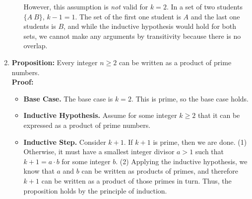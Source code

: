 \documentclass[11pt, preview]{standalone} %
\begin{document}
\begin{enumerate}
\begin{Choices}
\begin{enumerate}
However, this assumption is {\it not} valid for $k = 2$. In a set of two students $\{A\ B\}$, $k - 1 = 1$. The set of the first one student is ${A}$ and the last one students is ${B}$, and while the inductive hypothesis would hold for both sets, we cannot make any arguments by transitivity because there is no overlap.
\end{enumerate}
\end{Choices}

\item 
{\bf Proposition:} Every integer $n \ge 2$ can be written as a product of prime numbers.
\\
{\bf Proof:} 
\begin{itemize}
\item {\bf Base Case.} The base case is $k = 2$. This is prime, so the base case holds. 
\item {\bf Inductive Hypothesis.} Assume for some  integer $k \ge 2$ that it can be expressed as a product of prime numbers.
\item {\bf Inductive Step.} 
Consider $k+1$. 
If $k+1$ is prime, then we are done. 
(1) Otherwise, it must have a smallest integer divisor $a>1$ such that $k+1 = a\cdot b$ for some integer $b$. 
(2) Applying the inductive hypothesis, we know that $a$ and $b$ can be written as products of primes, and therefore $k+1$ can be written as a product of those primes in turn. 
Thus, the proposition holds by the principle of induction. 
\end{itemize}
\begin{enumerate}
\end{enumerate}
\end{enumerate}
\end{document}

